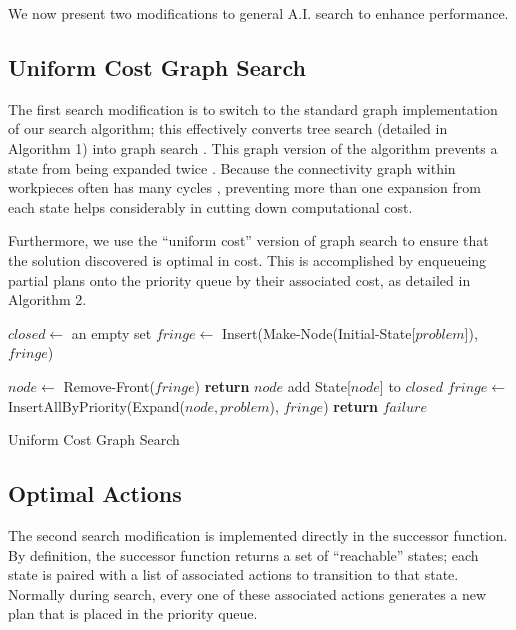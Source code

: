 We now present two modifications to general A.I. search to enhance performance.

	\subsection{Uniform Cost Graph Search}

The first search modification is to switch to the standard graph implementation of our search algorithm; this effectively converts tree search (detailed in Algorithm 1) into graph search \cite{AIBook}. This graph version of the algorithm prevents a state from being expanded twice \cite{AIBook}. Because the connectivity graph within workpieces often has many cycles \cite{Yasui2011}, preventing more than one expansion from each state helps considerably in cutting down computational cost.

Furthermore, we use the ``uniform cost'' version of graph search \cite{AIBook} to ensure that the solution discovered is optimal in cost. This is accomplished by enqueueing partial plans onto the priority queue by their associated cost, as detailed in Algorithm 2.

\begin{algorithm}[H]\label{graphSearch}
\begin{algorithmic}[1]
	\State $closed \gets$ an empty set
	\State $fringe \gets$ Insert(Make-Node(Initial-State[$problem$]),$fringe$)

		\State $node \gets$ Remove-Front($fringe$)
			\State \textbf{return} $node$ 
		\EndIf
			\State add State[$node$] to $closed$
			\State $fringe \gets$ InsertAllByPriority(Expand($node, problem$), $fringe$)
		\EndIf
	\EndWhile
	\State \textbf{return} $failure$ 

\EndFunction

\end{algorithmic}
\caption{Uniform Cost Graph Search}
\end{algorithm}

	\subsection{Optimal Actions}

The second search modification is implemented directly in the successor function. By definition, the successor function returns a set of ``reachable'' states; each state is paired with a list of associated actions to transition to that state. Normally during search, every one of these associated actions generates a new plan that is placed in the priority queue.

